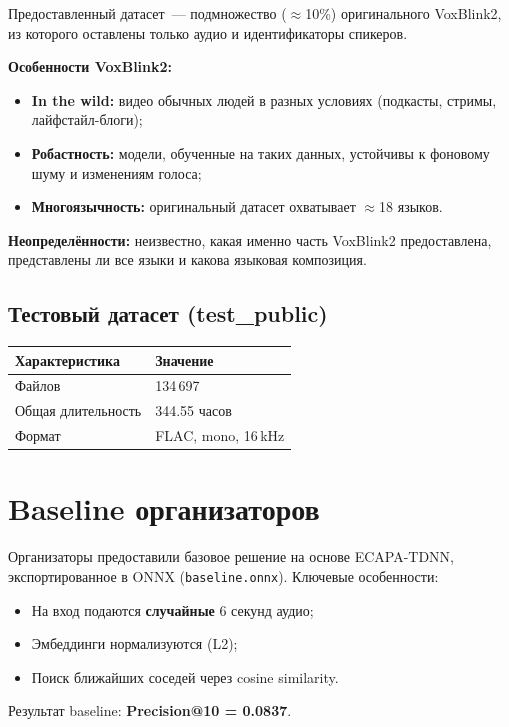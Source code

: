 \documentclass[12pt,a4paper]{article}
\begin{document}
\bigskip

Предоставленный датасет~--- подмножество ($\approx$10\%) оригинального VoxBlink2, из которого оставлены только аудио и идентификаторы спикеров.

\textbf{Особенности VoxBlink2:}
\begin{itemize}
  \item \textbf{In the wild:} видео обычных людей в разных условиях (подкасты, стримы, лайфстайл-блоги);
  \item \textbf{Робастность:} модели, обученные на таких данных, устойчивы к фоновому шуму и изменениям голоса;
  \item \textbf{Многоязычность:} оригинальный датасет охватывает $\approx$18 языков.
\end{itemize}

\textbf{Неопределённости:} неизвестно, какая именно часть VoxBlink2 предоставлена, представлены ли все языки и какова языковая композиция.

\subsection{Тестовый датасет (test\_public)}

\begin{tabular}{l l}
\hline
Характеристика & Значение \\
\hline
Файлов & 134\,697 \\
Общая длительность & 344.55 часов \\
Формат & FLAC, mono, 16\,kHz \\
\hline
\end{tabular}

\section{Baseline организаторов}

Организаторы предоставили базовое решение на основе ECAPA-TDNN, экспортированное в ONNX (\texttt{baseline.onnx}). Ключевые особенности:
\begin{itemize}
  \item На вход подаются \textbf{случайные} 6 секунд аудио;
  \item Эмбеддинги нормализуются (L2);
  \item Поиск ближайших соседей через cosine similarity.
\end{itemize}

Результат baseline: \textbf{Precision@10 = 0.0837}.
\end{document}
